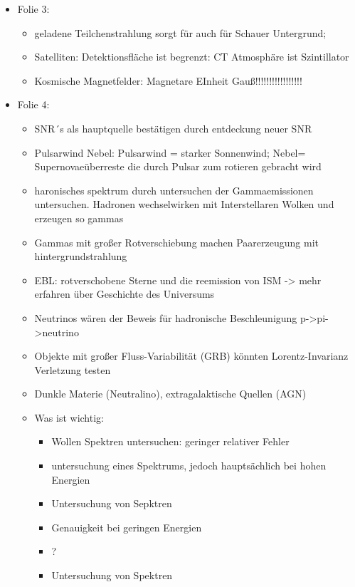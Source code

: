 \documentclass[
  bibliography=totoc,     %
  captions=tableheading,  %
  titlepage=firstiscover, %
]{scrartcl}
\begin{document}
  \begin{itemize}
    \item Folie 3:
      \begin{itemize}
        \item geladene Teilchenstrahlung sorgt für auch für Schauer Untergrund;
        \item Satelliten: Detektionsfläche ist begrenzt: CT Atmosphäre ist Szintillator
        \item Kosmische Magnetfelder: Magnetare EInheit Gauß!!!!!!!!!!!!!!!!!%
      \end{itemize}
    \item Folie 4:
      \begin{itemize}
        \item SNR´s als hauptquelle bestätigen durch entdeckung neuer SNR
        \item Pulsarwind Nebel: Pulsarwind = starker Sonnenwind; Nebel= Supernovaeüberreste die durch Pulsar zum rotieren gebracht wird
        \item haronisches spektrum durch untersuchen der Gammaemissionen untersuchen. Hadronen wechselwirken mit Interstellaren Wolken und erzeugen so gammas
        \item Gammas mit großer Rotverschiebung machen Paarerzeugung mit hintergrundstrahlung
        \item EBL: rotverschobene Sterne und die reemission von ISM -> mehr erfahren über Geschichte des Universums
        \item Neutrinos wären der Beweis für hadronische Beschleunigung p->pi->neutrino
        \item Objekte mit großer Fluss-Variabilität (GRB) könnten Lorentz-Invarianz Verletzung testen
        \item Dunkle Materie (Neutralino), extragalaktische Quellen (AGN)
        \item Was ist wichtig:
        \begin{itemize}
          \item Wollen Spektren untersuchen: geringer relativer Fehler
          \item untersuchung eines Spektrums, jedoch hauptsächlich bei hohen Energien
          \item Untersuchung von Sepktren
          \item Genauigkeit bei geringen Energien
          \item ?
          \item Untersuchung von Spektren

\end{itemize}
\end{itemize}
\end{itemize}
\end{document}

